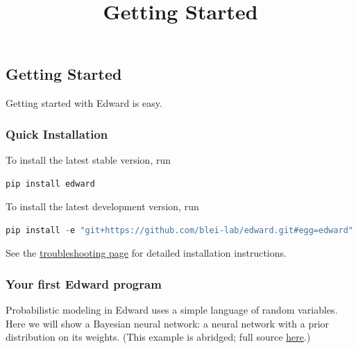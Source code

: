 \title{Getting Started}

\subsection{Getting Started}
Getting started with Edward is easy.

\subsubsection{Quick Installation}
To install the latest stable version, run

\begin{lstlisting}[language=Java]
pip install edward
\end{lstlisting}

To install the latest development version, run

\begin{lstlisting}[language=Java]
pip install -e "git+https://github.com/blei-lab/edward.git#egg=edward"
\end{lstlisting}

See the \href{troubleshooting}{troubleshooting page} for detailed
installation instructions.


\subsubsection{Your first Edward program}

Probabilistic modeling in Edward uses a simple language of
random variables. Here we will show a Bayesian neural network: a neural
network with a prior distribution on its weights.
(This example is abridged; full source
\href{https://github.com/blei-lab/edward/blob/master/examples/getting_started_example.py}
{here}.)

